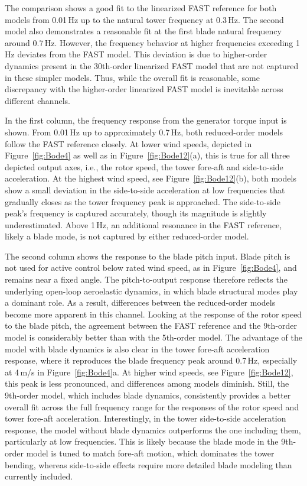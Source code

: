 {The comparison shows a good fit to the linearized FAST reference for both models from 0.01\,Hz up to the natural tower frequency at 0.3\,Hz. The second model also demonstrates a reasonable fit at the first blade natural frequency around 0.7\,Hz. However, the frequency behavior at higher frequencies exceeding 1\,Hz deviates from the FAST model. This deviation is due to higher-order dynamics present in the 30th-order linearized FAST model that are not captured in these simpler models. Thus, while the overall fit is reasonable, some discrepancy with the higher-order linearized FAST model is inevitable across different channels.

In the first column, the frequency response from the generator torque input is shown. From 0.01\,Hz up to approximately 0.7\,Hz, both reduced-order models follow the FAST reference closely. At lower wind speeds, depicted in Figure~\ref{fig:Bode4} as well as in Figure~\ref{fig:Bode12}(a), this is true for all three depicted output axes, i.e., the rotor speed, the tower fore-aft and side-to-side acceleration. At the highest wind speed, see Figure~\ref{fig:Bode12}(b), both models show a small deviation in the side-to-side acceleration at low frequencies that gradually closes as the tower frequency peak is approached. The side-to-side peak's frequency is captured accurately, though its magnitude is slightly underestimated. Above 1\,Hz, an additional resonance in the FAST reference, likely a blade mode, is not captured by either reduced-order model.

The second column shows the response to the blade pitch input. Blade pitch is not used for active control below rated wind speed, as in Figure~\ref{fig:Bode4}, and remains near a fixed angle. The pitch-to-output response therefore reflects the underlying open-loop aeroelastic dynamics, in which blade structural modes play a dominant role. As a result, differences between the reduced-order models become more apparent in this channel. Looking at the response of the rotor speed to the blade pitch, the agreement between the FAST reference and the 9th-order model is considerably better than with the 5th-order model. The advantage of the model with blade dynamics is also clear in the tower fore-aft acceleration response, where it reproduces the blade frequency peak around 0.7\,Hz, especially at 4\,m/s in Figure~\ref{fig:Bode4}a. At higher wind speeds, see Figure~\ref{fig:Bode12}, this peak is less pronounced, and differences among models diminish. Still, the 9th-order model, which includes blade dynamics, consistently provides a better overall fit across the full frequency range for the responses of the rotor speed and tower fore-aft acceleration. Interestingly, in the tower side-to-side acceleration response, the model without blade dynamics outperforms the one including them, particularly at low frequencies. This is likely because the blade mode in the 9th-order model is tuned to match fore-aft motion, which dominates the tower bending, whereas side-to-side effects require more detailed blade modeling than currently included.

}
